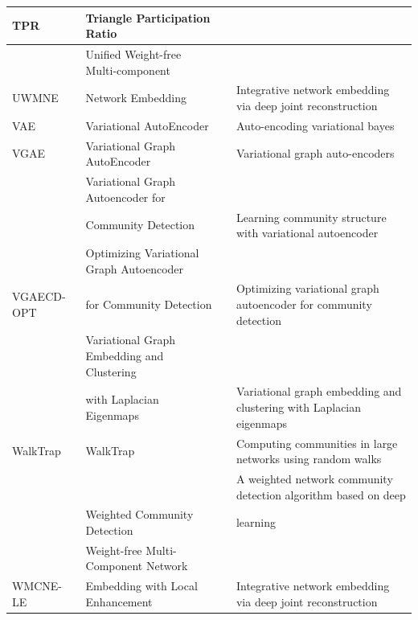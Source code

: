 \begin{table}[!t]
\begin{tabular}{llll}
\rowcolor{gray!30}
TPR & Triangle Participation Ratio & & \\ \midrule
& Unified Weight-free Multi-component & &  \\ 
\multirow{-2}{*}{UWMNE} & Network Embedding & \multirow{-2}{*}{} & \multirow{-2}{*}{Integrative network embedding via deep joint reconstruction} \\ \midrule
\rowcolor{gray!30}
VAE & Variational AutoEncoder &  & Auto-encoding variational bayes \\
VGAE & Variational Graph AutoEncoder &  & Variational graph auto-encoders \\
\rowcolor{gray!30}
& Variational Graph Autoencoder for &  &  \\ 
\rowcolor{gray!30}
\multirow{-2}{*}{VGAECD} & Community Detection & \multirow{-2}{*}{} & \multirow{-2}{*}{Learning community structure with variational autoencoder} \\ 
& Optimizing Variational Graph Autoencoder &  &  \\
\multirow{-2}{*}{VGAECD-OPT} & for Community Detection & \multirow{-2}{*}{} & \multirow{-2}{*}{Optimizing variational graph autoencoder for community detection} \\
\rowcolor{gray!30}
& Variational Graph Embedding and Clustering &  &  \\
\rowcolor{gray!30}
\multirow{-2}{*}{VGECLE} & with Laplacian Eigenmaps & \multirow{-2}{*}{} & \multirow{-2}{*}{Variational graph embedding and clustering with Laplacian eigenmaps} \\ \midrule
WalkTrap & WalkTrap  &  & Computing communities in large networks using random walks \\
\rowcolor{gray!30}
& & & A weighted network community detection algorithm based on deep \\
\rowcolor{gray!30}
\multirow{-2}{*}{WCD} & \multirow{-2}{*}{Weighted Community Detection} & \multirow{-2}{*}{} & learning \\
& Weight-free Multi-Component Network &  &  \\
\multirow{-2}{*}{WMCNE-LE} & Embedding with Local Enhancement & \multirow{-2}{*}{} & \multirow{-2}{*}{Integrative network embedding via deep joint reconstruction} \\
\bottomrule[1pt]
\end{tabular}\label{tab-abbr3}
\end{table}
